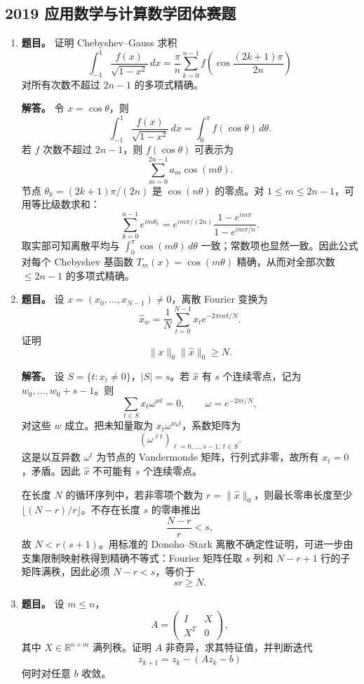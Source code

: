 ﻿\documentclass[UTF8,12pt]{ctexart}
\begin{document}
\subsection{2019 应用数学与计算数学团体赛题}
\begin{enumerate}[label=\textbf{\arabic*.},leftmargin=2.2em]
\item \textbf{题目。} 证明 Chebyshev--Gauss 求积
\[
\int_{-1}^1\frac{f(x)}{\sqrt{1-x^2}}\,dx
=\frac{\pi}{n}\sum_{k=0}^{n-1}f\!\left(\cos\frac{(2k+1)\pi}{2n}\right)
\]
对所有次数不超过 \(2n-1\) 的多项式精确。

\textbf{解答。} 令 \(x=\cos\theta\)，则
\[
\int_{-1}^1\frac{f(x)}{\sqrt{1-x^2}}\,dx
=\int_0^\pi f(\cos\theta)\,d\theta.
\]
若 \(f\) 次数不超过 \(2n-1\)，则 \(f(\cos\theta)\) 可表示为
\[
\sum_{m=0}^{2n-1} a_m\cos(m\theta).
\]
节点 \(\theta_k=(2k+1)\pi/(2n)\) 是 \(\cos(n\theta)\) 的零点。对 \(1\le m\le2n-1\)，可用等比级数求和：
\[
\sum_{k=0}^{n-1}e^{im\theta_k}
=e^{im\pi/(2n)}\frac{1-e^{im\pi}}{1-e^{im\pi/n}}.
\]
取实部可知离散平均与 \(\int_0^\pi\cos(m\theta)\,d\theta\) 一致；常数项也显然一致。因此公式对每个 Chebyshev 基函数 \(T_m(x)=\cos(m\theta)\) 精确，从而对全部次数 \(\le2n-1\) 的多项式精确。

\item \textbf{题目。} 设 \(x=(x_0,\ldots,x_{N-1})\ne0\)，离散 Fourier 变换为
\[
\widehat x_w=\frac1N\sum_{t=0}^{N-1}x_t e^{-2\pi iwt/N}.
\]
证明
\[
\|x\|_0\|\widehat x\|_0\ge N.
\]

\textbf{解答。} 设 \(S=\{t:x_t\ne0\}\)，\(|S|=s\)。若 \(\widehat x\) 有 \(s\) 个连续零点，记为 \(w_0,\ldots,w_0+s-1\)。则
\[
\sum_{t\in S}x_t \omega^{w t}=0,\qquad \omega=e^{-2\pi i/N},
\]
对这些 \(w\) 成立。把未知量取为 \(x_t\omega^{w_0t}\)，系数矩阵为
\[
(\omega^{\ell t})_{\ell=0,\ldots,s-1;\ t\in S}.
\]
这是以互异数 \(\omega^t\) 为节点的 Vandermonde 矩阵，行列式非零，故所有 \(x_t=0\)，矛盾。因此 \(\widehat x\) 不可能有 \(s\) 个连续零点。

在长度 \(N\) 的循环序列中，若非零项个数为 \(r=\|\widehat x\|_0\)，则最长零串长度至少 \(\lfloor (N-r)/r\rfloor\)。不存在长度 \(s\) 的零串推出
\[
\frac{N-r}{r}<s,
\]
故 \(N<r(s+1)\)。用标准的 Donoho--Stark 离散不确定性证明，可进一步由支集限制映射秩得到精确不等式：Fourier 矩阵任取 \(s\) 列和 \(N-r+1\) 行的子矩阵满秩，因此必须 \(N-r<s\)，等价于
\[
sr\ge N.
\]

\item \textbf{题目。} 设 \(m\le n\)，
\[
A=\begin{pmatrix}I&X\\X^T&0\end{pmatrix},
\]
其中 \(X\in\mathbb R^{n\times m}\) 满列秩。证明 \(A\) 非奇异，求其特征值，并判断迭代
\[
z_{k+1}=z_k-(Az_k-b)
\]
何时对任意 \(b\) 收敛。


\end{enumerate}
\end{document}

